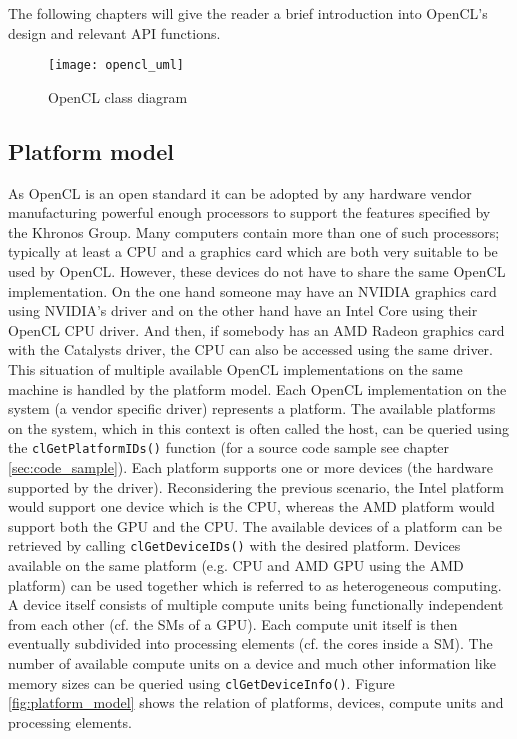 The following chapters will give the reader a brief introduction into OpenCL's design and relevant API functions. 

\begin{figure} %
\centering
\texttt{[image: opencl\_uml]}
\caption{OpenCL class diagram \cite{opencl_spec}}
\label{fig:opencl_uml}
\end{figure}

\subsection{Platform model}
As OpenCL is an open standard it can be adopted by any hardware vendor manufacturing powerful enough processors to support the features specified by the Khronos Group. Many computers contain more than one of such processors; typically at least a CPU and a graphics card which are both very suitable to be used by OpenCL. However, these devices do not have to share the same OpenCL implementation. On the one hand someone may have an NVIDIA graphics card using NVIDIA's driver and on the other hand have an Intel Core using their OpenCL CPU driver. And then, if somebody has an AMD Radeon graphics card with the Catalysts driver, the CPU can also be accessed using the same driver.
This situation of multiple available OpenCL implementations on the same machine is handled by the platform model. Each OpenCL implementation on the system (a vendor specific driver) represents a platform. The available platforms on the system, which in this context is often called the host, can be queried using the \lstinline!clGetPlatformIDs()! function (for a source code sample see chapter \ref{sec:code_sample}).
Each platform supports one or more devices (the hardware supported by the driver). Reconsidering the previous scenario, the Intel platform would support one device which is the CPU, whereas the AMD platform would support both the GPU and the CPU. The available devices of a platform can be retrieved by calling \lstinline!clGetDeviceIDs()! with the desired platform. Devices available on the same platform (e.g. CPU and AMD GPU using the AMD platform) can be used together which is referred to as heterogeneous computing. 
A device itself consists of multiple compute units being functionally independent from each other (cf. the SMs of a GPU). Each compute unit itself is then eventually subdivided into processing elements (cf. the cores inside a SM). The number of available compute units on a device and much other information like memory sizes can be queried using \lstinline!clGetDeviceInfo()!.
Figure \ref{fig:platform_model} shows the relation of platforms, devices, compute units and processing elements. \cite[p.19ff]{opencl_book}

